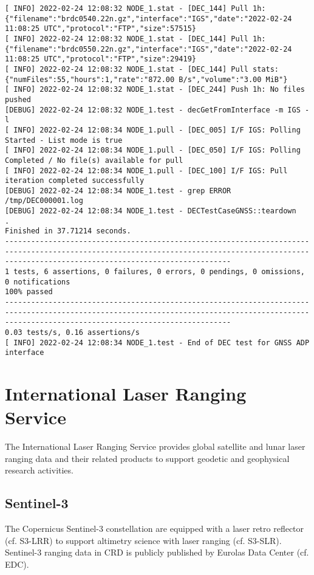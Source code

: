 \documentclass[dec_sum_main.tex]{subfiles}
\begin{document}
\begin{Verbatim}[fontsize=\tiny]
[ INFO] 2022-02-24 12:08:32 NODE_1.stat - [DEC_144] Pull 1h: {"filename":"brdc0540.22n.gz","interface":"IGS","date":"2022-02-24 11:08:25 UTC","protocol":"FTP","size":57515}
[ INFO] 2022-02-24 12:08:32 NODE_1.stat - [DEC_144] Pull 1h: {"filename":"brdc0550.22n.gz","interface":"IGS","date":"2022-02-24 11:08:25 UTC","protocol":"FTP","size":29419}
[ INFO] 2022-02-24 12:08:32 NODE_1.stat - [DEC_144] Pull stats: {"numFiles":55,"hours":1,"rate":"872.00 B/s","volume":"3.00 MiB"}
[ INFO] 2022-02-24 12:08:32 NODE_1.stat - [DEC_244] Push 1h: No files pushed
[DEBUG] 2022-02-24 12:08:32 NODE_1.test - decGetFromInterface -m IGS -l
[ INFO] 2022-02-24 12:08:34 NODE_1.pull - [DEC_005] I/F IGS: Polling Started - List mode is true
[ INFO] 2022-02-24 12:08:34 NODE_1.pull - [DEC_050] I/F IGS: Polling Completed / No file(s) available for pull
[ INFO] 2022-02-24 12:08:34 NODE_1.pull - [DEC_100] I/F IGS: Pull iteration completed successfully
[DEBUG] 2022-02-24 12:08:34 NODE_1.test - grep ERROR /tmp/DEC000001.log
[DEBUG] 2022-02-24 12:08:34 NODE_1.test - DECTestCaseGNSS::teardown
.
Finished in 37.71214 seconds.
------------------------------------------------------------------------------------------------------------------------------------------------------------------------------------------------
1 tests, 6 assertions, 0 failures, 0 errors, 0 pendings, 0 omissions, 0 notifications
100% passed
------------------------------------------------------------------------------------------------------------------------------------------------------------------------------------------------
0.03 tests/s, 0.16 assertions/s
[ INFO] 2022-02-24 12:08:34 NODE_1.test - End of DEC test for GNSS ADP interface	
\end{Verbatim}

\pagebreak

\section{International Laser Ranging Service}
The International Laser Ranging Service provides global satellite and lunar laser ranging data and their related products to support geodetic and geophysical research activities.

\subsection{Sentinel-3}
The Copernicus Sentinel-3 constellation are equipped with a laser retro reflector (cf. S3-LRR) to support altimetry science with laser ranging (cf. S3-SLR). Sentinel-3 ranging data in CRD is publicly published by Eurolas Data Center (cf. EDC).\newline
\end{document}
